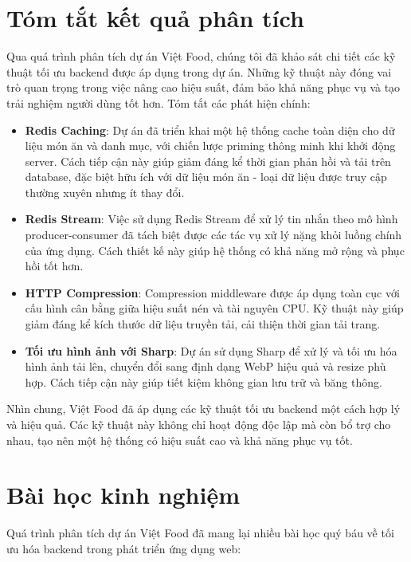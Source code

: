 \section{Tóm tắt kết quả phân tích}

Qua quá trình phân tích dự án Việt Food, chúng tôi đã khảo sát chi tiết các kỹ thuật tối ưu backend được áp dụng trong dự án. Những kỹ thuật này đóng vai trò quan trọng trong việc nâng cao hiệu suất, đảm bảo khả năng phục vụ và tạo trải nghiệm người dùng tốt hơn. Tóm tắt các phát hiện chính:

\begin{itemize}
    \item \textbf{Redis Caching}: Dự án đã triển khai một hệ thống cache toàn diện cho dữ liệu món ăn và danh mục, với chiến lược priming thông minh khi khởi động server. Cách tiếp cận này giúp giảm đáng kể thời gian phản hồi và tải trên database, đặc biệt hữu ích với dữ liệu món ăn - loại dữ liệu được truy cập thường xuyên nhưng ít thay đổi.
    
    \item \textbf{Redis Stream}: Việc sử dụng Redis Stream để xử lý tin nhắn theo mô hình producer-consumer đã tách biệt được các tác vụ xử lý nặng khỏi luồng chính của ứng dụng. Cách thiết kế này giúp hệ thống có khả năng mở rộng và phục hồi tốt hơn.
    
    \item \textbf{HTTP Compression}: Compression middleware được áp dụng toàn cục với cấu hình cân bằng giữa hiệu suất nén và tài nguyên CPU. Kỹ thuật này giúp giảm đáng kể kích thước dữ liệu truyền tải, cải thiện thời gian tải trang.
    
    \item \textbf{Tối ưu hình ảnh với Sharp}: Dự án sử dụng Sharp để xử lý và tối ưu hóa hình ảnh tải lên, chuyển đổi sang định dạng WebP hiệu quả và resize phù hợp. Cách tiếp cận này giúp tiết kiệm không gian lưu trữ và băng thông.
\end{itemize}

Nhìn chung, Việt Food đã áp dụng các kỹ thuật tối ưu backend một cách hợp lý và hiệu quả. Các kỹ thuật này không chỉ hoạt động độc lập mà còn bổ trợ cho nhau, tạo nên một hệ thống có hiệu suất cao và khả năng phục vụ tốt.

\section{Bài học kinh nghiệm}

Quá trình phân tích dự án Việt Food đã mang lại nhiều bài học quý báu về tối ưu hóa backend trong phát triển ứng dụng web:

